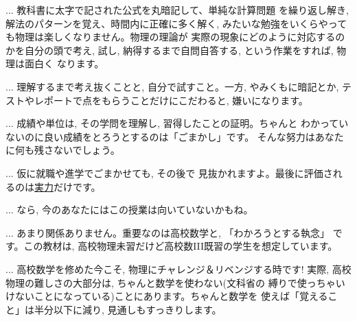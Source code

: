 \begin{faq}{\small{}
 ... 教科書に太字で記された公式を丸暗記して、単純な計算問題
を繰り返し解き, 解法のパターンを覚え、時間内に正確に多く解く, 
みたいな勉強をいくらやっても物理は楽しくなりません。物理の理論が
実際の現象にどのように対応するのかを自分の頭で考え, 
試し, 納得するまで自問自答する, という作業をすれば, 物理は面白く
なります。}\end{faq}

\begin{faq}{\small{} ... 
理解するまで考え抜くことと, 自分で試すこと。一方, やみくもに暗記とか, 
テストやレポートで点をもらうことだけにこだわると, 嫌いになります。}\end{faq}

\begin{faq}{\small{} ... 
成績や単位は, その学問を理解し, 習得したことの証明。ちゃんと
わかっていないのに良い成績をとろうとするのは「ごまかし」です。
そんな努力はあなたに何も残さないでしょう。}\end{faq}

\begin{faq}{\small{} ... 仮に就職や進学でごまかせても, その後で
見抜かれますよ。最後に評価されるのは\underline{実力}だけです。}\end{faq}

\begin{faq}{\small{}
 ... なら, 今のあなたにはこの授業は向いていないかもね。}\end{faq}

\begin{faq}{\small{}
... あまり関係ありません。重要なのは高校数学と, 「わかろうとする執念」
です。この教材は, 高校物理未習だけど高校数III既習の学生を想定しています。}\end{faq}

\begin{faq}{\small{}
... 高校数学を修めた今こそ, 物理にチャレンジ＆リベンジする時です! 
実際, 高校物理の難しさの大部分は, ちゃんと数学を使わない(文科省の
縛りで使っちゃいけないことになっている)ことにあります。ちゃんと数学を
使えば「覚えること」は半分以下に減り, 見通しもすっきりします。}\end{faq}

